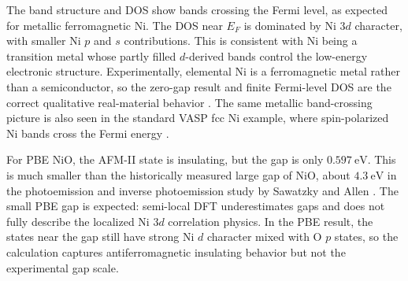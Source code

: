 \begin{table}[h]
\centering
\caption{Task C electronic-structure summary.  The band gaps were extracted
from the dense uniform-mesh \texttt{dos/EIGENVAL} files, while the dominant
orbital characters were estimated from the PDOS within
\(\pm0.5~\mathrm{eV}\) of the Fermi level.}
\label{tab:task-c-summary}
\end{table}

The band structure and DOS show bands crossing the
Fermi level, as expected for metallic ferromagnetic Ni.  The DOS near
\(E_F\) is dominated by Ni \(3d\) character, with smaller Ni \(p\) and \(s\)
contributions.  This is consistent with Ni being a transition metal whose
partly filled \(d\)-derived bands control the low-energy electronic structure.
Experimentally, elemental Ni is a ferromagnetic metal rather than a
semiconductor, so the zero-gap result and finite Fermi-level DOS are the
correct qualitative real-material behavior \cite{kittel,crangle-goodman}.  The
same metallic band-crossing picture is also seen in the standard VASP fcc Ni
example, where spin-polarized Ni bands cross the Fermi energy
\cite{vasp-fcc-ni}.

For PBE NiO, the AFM-II state is insulating, but the gap is only
\(0.597~\mathrm{eV}\).  This is much smaller than the historically measured
large gap of NiO, about \(4.3~\mathrm{eV}\) in the photoemission and inverse
photoemission study by Sawatzky and Allen \cite{sawatzky-allen-nio}.  The small
PBE gap is expected: semi-local DFT underestimates gaps and does not fully
describe the localized Ni \(3d\) correlation physics.  In the PBE result, the
states near the gap still have strong Ni \(d\) character mixed with O \(p\)
states, so the calculation captures antiferromagnetic insulating behavior but
not the experimental gap scale.

